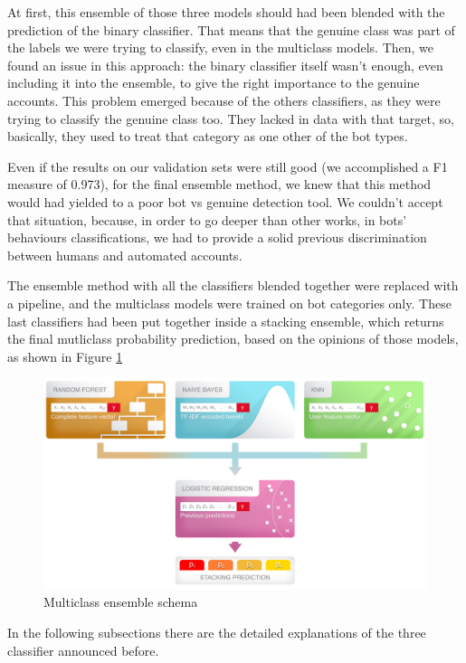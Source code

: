 At first, this ensemble of those three models should had been blended with the prediction of the binary classifier. That means that the genuine class was part of the labels we were trying to classify, even in the multiclass models. Then, we found an issue in this approach: the binary classifier itself wasn't enough, even including it into the ensemble, to give the right importance to the genuine accounts. This problem emerged because of the others classifiers, as they were trying to classify the genuine class too. They lacked in data with that target, so, basically, they used to treat that category as one other of the bot types.

Even if the results on our validation sets were still good (we accomplished a F1 measure of 0.973), for the final ensemble method, we knew that this method would had yielded to a poor bot vs genuine detection tool. We couldn't accept that situation, because, in order to go deeper than other works, in bots' behaviours classifications, we had to provide a solid previous discrimination between humans and automated accounts.

The ensemble method with all the classifiers blended together were replaced with a pipeline, and the multiclass models were trained on bot categories only.
These last classifiers had been put together inside a stacking ensemble, which returns the final mutliclass probability prediction, based on the opinions of those models, as shown in Figure \ref{fig:stacking_schema}

\begin{figure}[htp!]
	\centering
	\includegraphics[width=\columnwidth]{chapter5/figure/stacking.png}
	\caption{Multiclass ensemble schema}
	\label{fig:stacking_schema}
\end{figure}
In the following subsections there are the detailed explanations of the three classifier announced before.

